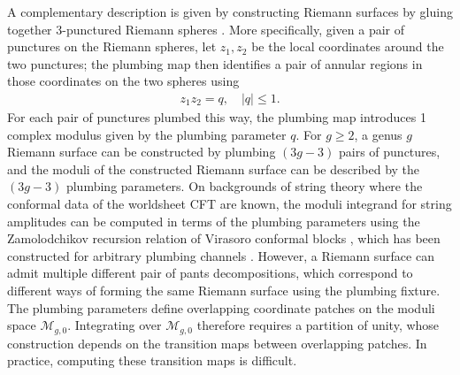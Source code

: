 \documentclass[12pt]{article}
\def\ie{\begin{equation}\begin{aligned}}
\def\fe{\end{aligned}\end{equation}}
\numberwithin{equation}{section}
\begin{document}
A complementary description is given by constructing Riemann surfaces by gluing together 3-punctured Riemann spheres \cite{Polchinski:1988Factorization}. More specifically, given a pair of punctures on the Riemann spheres, let $z_1, z_2$ be the local coordinates around the two punctures; the plumbing map then identifies a pair of annular regions in those coordinates on the two spheres using
\ie
z_1 z_2 = q,\quad |q|\leq 1.
\fe
For each pair of punctures plumbed this way, the plumbing map introduces 1 complex modulus given by the plumbing parameter $q$. For $g\geq 2$, a genus $g$ Riemann surface can be constructed by plumbing $(3g-3)$ pairs of punctures, and the moduli of the constructed Riemann surface can be described by the $(3g-3)$ plumbing parameters. On backgrounds of string theory where the conformal data of the worldsheet CFT are known, the moduli integrand for string amplitudes can be computed in terms of the plumbing parameters using the Zamolodchikov recursion relation of Virasoro conformal blocks \cite{Zamolodchikov}, which has been constructed for arbitrary plumbing channels \cite{Cho-Collier-Yin}. However, a Riemann surface can admit multiple different pair of pants decompositions, which correspond to different ways of forming the same Riemann surface using the plumbing fixture. The plumbing parameters define overlapping coordinate patches on the moduli space $\mathcal{M}_{g,0}$. Integrating over $\mathcal{M}_{g,0}$ therefore requires a partition of unity, whose construction depends on the transition maps between overlapping patches. In practice, computing these transition maps %
is difficult.
\end{document}
